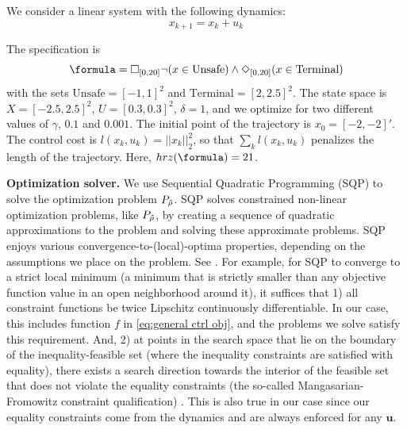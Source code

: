 \begin{exmp}
\label{ex:toyproblem}
We consider a linear system with the following dynamics:
\begin{equation}
\label{eq:PointMass}
x_{k+1} = x_k + u_k
\end{equation}

The specification is 
\[\formula = \always_{[0,20]} \neg (x \in \text{Unsafe}) \land \eventually_{[0,20]} (x \in \text{Terminal})\]
with the sets $\text{Unsafe}=[-1,1]^2$ and $\text{Terminal}=[2,2.5]^2$. 
The state space is $X=[-2.5,2.5]^2$, $U=[0.3,0.3]^2$, $\delta=1$, and we optimize for two different values of $\gamma$, $0.1$ and $0.001$. 
The initial point of the trajectory is $x_0=[-2,-2]'$. 
The control cost is $l(x_k,u_k) = ||x_k||_{2}^2$, so that $\sum_kl(x_k,u_k)$ penalizes the length of the trajectory. Here, $hrz(\formula) = 21$.

\textbf{Optimization solver.}
We use Sequential Quadratic Programming (SQP) to solve the optimization problem $P_{\tilde{\rho}}$.
SQP solves constrained non-linear optimization problems, like $P_{\tilde{\rho}}$, by creating a sequence of quadratic approximations to the problem and solving these approximate problems.
SQP enjoys various convergence-to-(local)-optima properties, depending on the assumptions we place on the problem. 
See \cite[Section 2.9]{Polak97_Optim}.
For example, for SQP to converge to a strict local minimum (a minimum that is strictly smaller than any objective function value in an open neighborhood around it), it suffices that 
1) all constraint functions be twice Lipschitz continuously differentiable. 
In our case, this includes function $f$ in \eqref{eq:general ctrl obj}, and the problems we solve satisfy this requirement.
And, 
2) at points in the search space that lie on the boundary of the inequality-feasible set (where the inequality constraints are satisfied with equality), there exists a search direction towards the interior of the feasible set that does not violate the equality constraints (the so-called Mangasarian-Fromowitz constraint qualification) \cite[Assumption 2.9.1]{Polak97_Optim}.
This is also true in our case since our equality constraints come from the dynamics and are always enforced for any $\mathbf{u}$.


\end{exmp}
